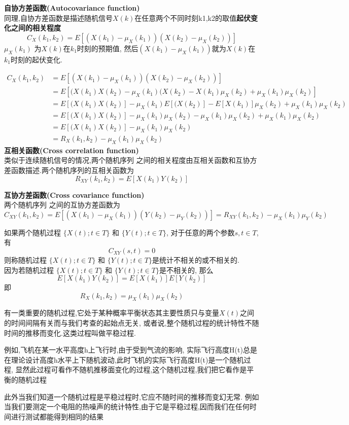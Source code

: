 \documentclass{article}
\begin{document}
\textbf{自协方差函数(Autocovariance function)}\\
同理,自协方差函数是描述随机信号$X(k)$在任意两个不同时刻k1,k2的取值\textbf{起伏变化之间的相关程度}
$$ C_X(k_1,k_2) = E[(X(k_1) - \mu_X(k_1)) (X(k_2) - \mu_X(k_2))] $$
$\mu_X(k_1)$ 为$X(k)$在$k_1$时刻的预期值, 然后$(X(k_1) - \mu_X(k_1))$就为$X(k)$在$k_1$时刻的起伏变化.

$$
\begin{aligned}
C_X(k_1,k_2)
& = E[(X(k_1) - \mu_X(k_1)) (X(k_2) - \mu_X(k_2))] \\
& = E[(X(k_1) X(k_2) - \mu_X(k_1)(X(k_2) - X(k_1)\mu_X(k_2) + \mu_X(k_1) \mu_X(k_2)] \\
& = E[(X(k_1) X(k_2)] - \mu_X(k_1)E[(X(k_2)] - E[X(k_1)]\mu_X(k_2) + \mu_X(k_1) \mu_X(k_2) \\
& = E[(X(k_1) X(k_2)] - \mu_X(k_1) \mu_X(k_2) - \mu_X(k_1) \mu_X(k_2) + \mu_X(k_1) \mu_X(k_2) \\
& = E[(X(k_1) X(k_2)] - \mu_X(k_1) \mu_X(k_2)\\
& = R_X(k_1, k_2) - \mu_X(k_1) \mu_X(k_2)
\end{aligned}
$$
\textbf{互相关函数(Cross correlation function)}\\
类似于连续随机信号的情况,两个随机序列 之间的相关程度由互相关函数和互协方差函数描述.两个随机序列的互相关函数为
$$ R_{XY}(k_1, k_2) = E[X(k_1) Y(k_2)]$$

\textbf{互协方差函数(Cross covariance function)}\\
两个随机序列 之间的互协方差函数为
$$ C_{XY}(k_1,k_2) = E[(X(k_1) - \mu_X(k_1)) (Y(k_2) - \mu_Y(k_2))] = R_{XY}(k_1,k_2) - \mu_X(k_1) \mu_Y(k_2) $$

如果两个随机过程 $\{X(t); t \in T\}$ 和 $\{Y(t); t \in T\}$,
对于任意的两个参数$s,t \in T$, 有 $$ C_{XY}(s,t) = 0 $$
则称随机过程 $\{X(t); t \in T\}$ 和 $\{Y(t); t \in T\}$是统计不相关的或不相关的.\\
因为若随机过程 $\{X(t); t \in T\}$ 和 $\{Y(t); t \in T\}$是不相关的, 那么
$$ E[X(k_1) Y(k_2)] = E[X(k_1)] E[Y(k_2)] $$
即
$$R_X(k_1, k_2) = \mu_X(k_1) \mu_X(k_2)$$

有一类重要的随机过程,它处于某种概率平衡状态其主要性质只与变量$X(t)$之间的时间间隔有关而与我们考查的起始点无关, 
或者说,整个随机过程的统计特性不随时间的推移而变化.这类过程叫做平稳过程.

\begin{example}
例如,飞机在某一水平高度h上飞行时,由于受到气流的影响,
实际飞行高度H(t)总是在理论设计高度h水平上下随机波动,此时飞机的实际飞行高度H(t)是一个随机过程,
显然此过程可看作不随机推移面变化的过程,这个随机过程,我们把它看作是平衡的随机过程
\end{example}

此外当我们知道一个随机过程是平稳过程时,它应不随时间的推移而变幻无常.
例如当我们要测定一个电阻的热噪声的统计特性,由于它是平稳过程,因而我们在任何时间进行测试都能得到相同的结果
\end{document}
